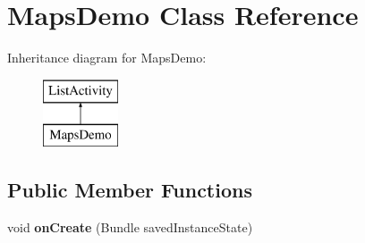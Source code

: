 \hypertarget{classcom_1_1example_1_1android_1_1apis_1_1_maps_demo}{\section{Maps\-Demo Class Reference}
\label{classcom_1_1example_1_1android_1_1apis_1_1_maps_demo}
}
Inheritance diagram for Maps\-Demo\-:\begin{figure}[H]
\begin{center}
\leavevmode
\includegraphics[height=2.000000cm]{classcom_1_1example_1_1android_1_1apis_1_1_maps_demo}
\end{center}
\end{figure}
\subsection*{Public Member Functions}
\begin{DoxyCompactItemize}
\item 
\hypertarget{classcom_1_1example_1_1android_1_1apis_1_1_maps_demo_a85e87cb5ced88dff7c8173ecc4f636d1}{void {\bfseries on\-Create} (Bundle saved\-Instance\-State)}\label{classcom_1_1example_1_1android_1_1apis_1_1_maps_demo_a85e87cb5ced88dff7c8173ecc4f636d1}

\end{DoxyCompactItemize}
